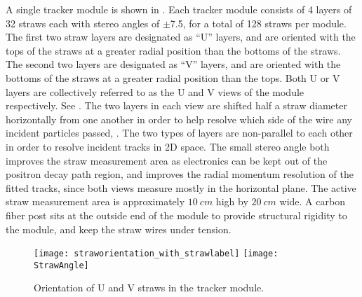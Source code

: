 A single tracker module is shown in . Each tracker module consists of 4 layers of 32 straws each with stereo angles of $\pm$7.5\textdegree{}, for a total of 128 straws per module. The first two straw layers are designated as ``U'' layers, and are oriented with the tops of the straws at a greater radial position than the bottoms of the straws. The second two layers are designated as ``V'' layers, and are oriented with the bottoms of the straws at a greater radial position than the tops. Both U or V layers are collectively referred to as the U and V views of the module respectively. See . The two layers in each view are shifted half a straw diameter horizontally from one another in order to help resolve which side of the wire any incident particles passed, . The two types of layers are non-parallel to each other in order to resolve incident tracks in 2D space. The small stereo angle both improves the straw measurement area as electronics can be kept out of the positron decay path region, and improves the radial momentum resolution of the fitted tracks, since both views measure mostly in the horizontal plane. The active straw measurement area is approximately $\SI{10}{cm}$ high by $\SI{20}{cm}$ wide. A carbon fiber post sits at the outside end of the module to provide structural rigidity to the module, and keep the straw wires under tension. 



\begin{figure}
\centering
        \texttt{[image: straworientation\_with\_strawlabel]}
    \hspace{1cm}
        \texttt{[image: StrawAngle]}
\caption[Tracker module coordinate system]{Orientation of U and V straws in the tracker module.}
\label{fig:trackermodulecoordsys}
\end{figure}



